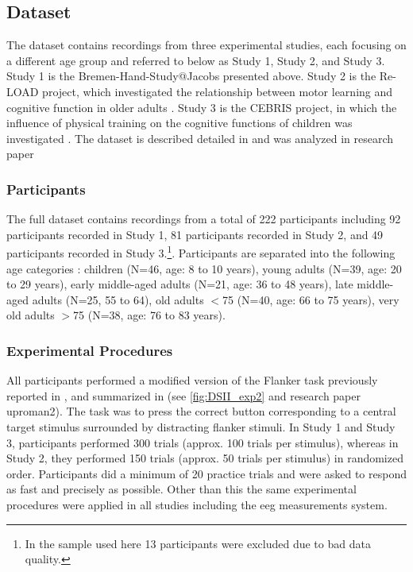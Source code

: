 \subsection{Dataset }
\label{methods:datasets:II}
The  dataset contains recordings from three experimental studies, each focusing on a different age group and referred to below as Study 1, Study 2, and Study 3.\\
Study 1 is the Bremen-Hand-Study@Jacobs presented above. Study 2 is the Re-LOAD project, which investigated the relationship between motor learning and cognitive function in older adults \cite{HUBNER2018104, Hübner2018}. Study 3 is the CEBRIS project, in which the influence of physical training on the cognitive functions of children was investigated \cite{Koutsandreou2016}. The dataset is described detailed in \cite{Reuter2019} and was analyzed in research paper 

\subsubsection{Participants}
\label{methods:datasets:II:participants}
The full dataset contains recordings from a total of 222 participants including 92 participants recorded in Study 1, 81 participants recorded in Study 2, and 49 participants recorded in Study 3.\footnote{In the sample used here 13 participants were excluded due to bad data quality.}. Participants are separated into the following age categories \cite{Reuter2019}: children (N=46, age: 8 to 10 years), young adults (N=39, age: 20 to 29 years), early middle-aged adults (N=21, age: 36 to 48 years), late middle-aged adults (N=25, 55 to 64), old adults $<$75 (N=40, age: 66 to 75 years), very old adults $>$75 (N=38, age: 76 to 83 years).

\subsubsection{Experimental Procedures}
\label{methods:datasets:II:experiment}
All participants performed a modified version of the Flanker task previously reported in \cite{Reuter2017, Winneke2012, Winneke2019}, and summarized in \cite{Reuter2019} (see \autoref{fig:DSII_exp2} and research paper uproman{2}). The task was to press the correct button corresponding to a central target stimulus surrounded by distracting flanker stimuli. In Study 1 and Study 3, participants performed 300 trials (approx. 100 trials per stimulus), whereas in Study 2, they performed 150 trials (approx. 50 trials per stimulus) in randomized order. Participants did a minimum of 20 practice trials and were asked to respond as fast and precisely as possible. Other than this the same experimental procedures were applied in all studies including the \gls{eeg} measurements system. 

